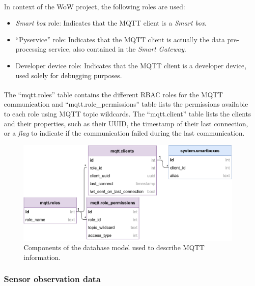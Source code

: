 \paragraph{} In context of the \acs{WoW} project, the following roles are used:

\begin{itemize}
    \item \textit{Smart box} role: Indicates that the \acs{MQTT} client is a \textit{Smart box}.
    \item ``Pyservice'' role: Indicates that the \acs{MQTT} client is actually the data pre-processing service, also contained in the \textit{Smart Gateway}.
    \item Developer device role: Indicates that the \acs{MQTT} client is a developer device, used solely for debugging purposes.
\end{itemize}

\paragraph{} The ``mqtt.roles'' table contains the different \acs{RBAC} roles for the \acs{MQTT} communication and ``mqtt.role\_permissions'' table lists the permissions available to each role using \acs{MQTT} topic wildcards. The ``mqtt.client'' table lists the clients and their properties, such as their \acs{UUID}, the timestamp of their last connection, or a \textit{flag} to indicate if the communication failed during the last communication.

\begin{figure}[H]
    \centering
    \includegraphics[width=0.75\linewidth]{images/database-schema-mqtt.pdf}
    \caption{Components of the database model used to describe \acs{MQTT} information. }
    \label{fig:wow-dbschema-mqtt}
\end{figure}


\subsubsection{Sensor observation data}

